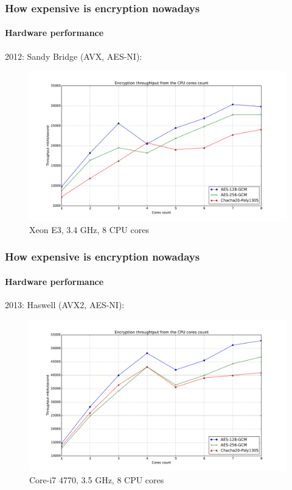 \documentclass[12pt,t]{beamer}
\begin{document}
\begin{frame}
\frametitle{How expensive is encryption nowadays}
\framesubtitle{Hardware performance}
2012: Sandy Bridge (AVX, AES-NI):
\begin{figure}[H]
\includegraphics[height=0.6\textheight]{perf-e3.pdf}
\caption{Xeon E3, 3.4 GHz, 8 CPU cores}
\end{figure}
\end{frame}

\begin{frame}
\frametitle{How expensive is encryption nowadays}
\framesubtitle{Hardware performance}
2013: Haswell (AVX2, AES-NI):
\begin{figure}[H]
\includegraphics[height=0.6\textheight]{perf-i7.pdf}
\caption{Core-i7 4770, 3.5 GHz, 8 CPU cores}
\end{figure}
\end{frame}
\end{document}
